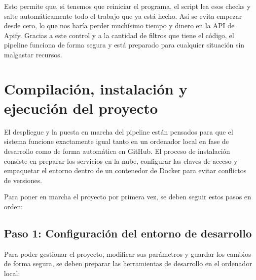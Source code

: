 Esto permite que, si tenemos que reiniciar el programa, el script lea esos checks y salte automáticamente todo el trabajo que ya está hecho. Así se evita empezar desde cero, lo que nos haría perder muchísimo tiempo y dinero en la API de Apify. Gracias a este control y a la cantidad de filtros que tiene el código, el pipeline funciona de forma segura y está preparado para cualquier situación sin malgastar recursos.


\section{Compilación, instalación y ejecución del proyecto}
El despliegue y la puesta en marcha del pipeline están pensados para que el sistema funcione exactamente igual tanto en un ordenador local en fase de desarrollo como de forma automática en GitHub. El proceso de instalación consiste en preparar los servicios en la nube, configurar las claves de acceso y empaquetar el entorno dentro de un contenedor de Docker para evitar conflictos de versiones.

Para poner en marcha el proyecto por primera vez, se deben seguir estos pasos en orden:

\subsection{Paso 1: Configuración del entorno de desarrollo}
Para poder gestionar el proyecto, modificar sus parámetros y guardar los cambios de forma segura, se deben preparar las herramientas de desarrollo en el ordenador local:


